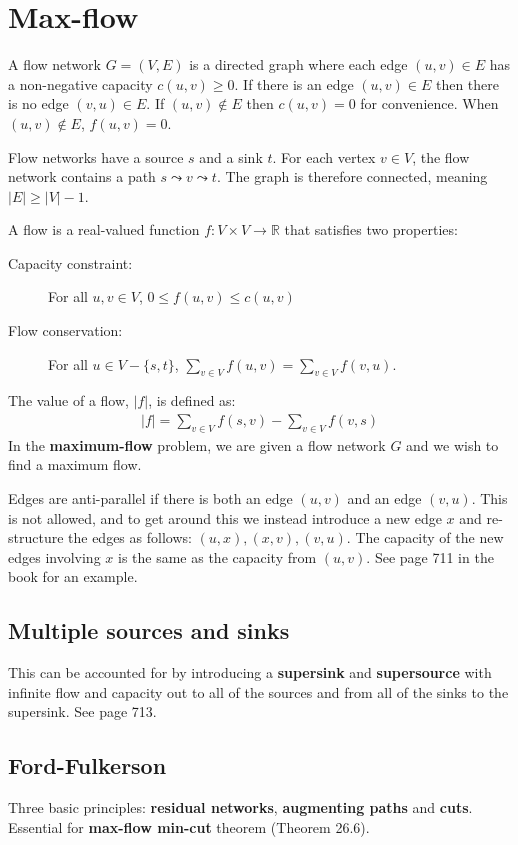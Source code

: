 \section{Max-flow}
A flow network $G = (V,E)$ is a directed graph where each edge $(u,v) \in E$ has
a non-negative capacity $c(u,v) \geq 0$. If there is an edge $(u,v) \in E$ then
there is no edge $(v,u) \in E$. If $(u,v) \notin E$ then $c(u,v) = 0$ for convenience.
When $(u,v) \notin E$, $f(u,v) = 0$.

Flow networks have a source $s$ and a sink $t$. For each vertex $v \in V$, the flow
network contains a path $s \leadsto v \leadsto t$. The graph is therefore connected, meaning
$|E| \geq |V| - 1$.

A flow is a real-valued function $f : V \times V \rightarrow \mathbb{R}$ that satisfies
two properties:
\begin{description}
	\item[Capacity constraint:] For all $u,v \in V$, $0 \leq f(u,v) \leq c(u,v)$

	\item[Flow conservation:] For all $u \in V - \{s,t\}$, 
	$\sum_{v \in V} f(u,v) = \sum_{v \in V} f(v,u)$.
\end{description}
The value of a flow, $|f|$, is defined as:
\begin{align*}
	|f| = \sum_{v \in V} f(s,v) - \sum_{v \in V} f(v,s)
\end{align*}
In the \textbf{maximum-flow} problem, we are given a flow network $G$ and we wish to find
a maximum flow.

Edges are anti-parallel if there is both an edge $(u,v)$ and an edge $(v,u)$. This is not allowed,
and to get around this we instead introduce a new edge $x$ and re-structure the edges as follows:
$(u,x), (x,v), (v,u)$. The capacity of the new edges involving $x$ is the same as the capacity from
$(u,v)$. See page 711 in the book for an example.

\subsection{Multiple sources and sinks}
This can be accounted for by introducing a \textbf{supersink} and \textbf{supersource} with infinite
flow and capacity out to all of the sources and from all of the sinks to the supersink. See page 713.

\subsection{Ford-Fulkerson}
Three basic principles: \textbf{residual networks}, \textbf{augmenting paths} and \textbf{cuts}.
Essential for \textbf{max-flow min-cut} theorem (Theorem 26.6).

